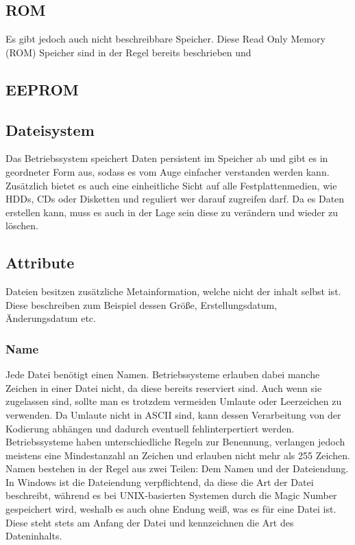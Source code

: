 \documentclass{article}
\begin{document}
	\subsection{ROM}
	Es gibt jedoch auch nicht beschreibbare Speicher. Diese Read Only Memory (ROM) Speicher sind in der Regel bereits beschrieben und 
	\subsection{EEPROM}
	\subsection{Dateisystem}
	Das Betriebssystem speichert Daten persistent im Speicher ab und gibt es in geordneter Form aus, sodass es vom Auge einfacher verstanden werden kann. Zusätzlich bietet es auch eine einheitliche Sicht auf alle Festplattenmedien, wie HDDs, CDs oder Disketten und reguliert wer darauf zugreifen darf. Da es Daten erstellen kann, muss es auch in der Lage sein diese zu verändern und wieder zu löschen. \\
	\subsection{Attribute}
	Dateien besitzen zusätzliche Metainformation, welche nicht der inhalt selbst ist. Diese beschreiben zum Beispiel dessen Größe, Erstellungsdatum, Änderungsdatum etc.
	\subsubsection{Name}
	Jede Datei benötigt einen Namen. Betriebssysteme erlauben dabei manche Zeichen in einer Datei nicht, da diese bereits reserviert sind. Auch wenn sie zugelassen sind, sollte man es trotzdem vermeiden Umlaute oder Leerzeichen zu verwenden. Da Umlaute nicht in ASCII sind, kann dessen Verarbeitung von der Kodierung abhängen und dadurch eventuell fehlinterpertiert werden. \\
	Betriebssysteme haben unterschiedliche Regeln zur Benennung, verlangen jedoch meistens eine Mindestanzahl an Zeichen und erlauben nicht mehr als 255 Zeichen. \\
	Namen bestehen in der Regel aus zwei Teilen: Dem Namen und der Dateiendung. \\
	In Windows ist die Dateiendung verpflichtend, da diese die Art der Datei beschreibt, während es bei UNIX-basierten Systemen durch die Magic Number gespeichert wird, weshalb es auch ohne Endung weiß, was es für eine Datei ist. Diese steht stets am Anfang der Datei und kennzeichnen die Art des Dateninhalts.\\
\end{document}
